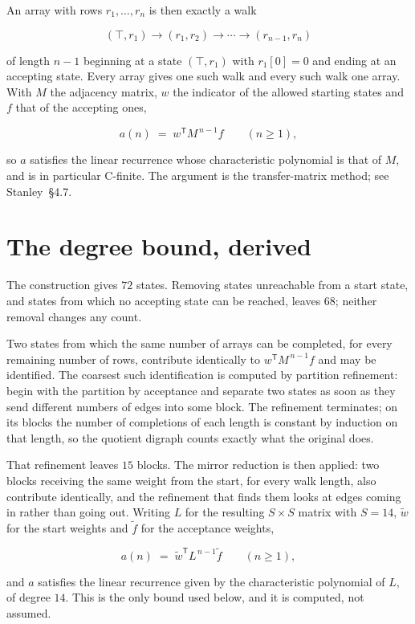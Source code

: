 \documentclass[11pt]{article}
\theoremstyle{definition}
\begin{document}
An array with rows $r_1,\dots,r_n$ is then exactly a walk

\[(\top,r_1) \to (r_1,r_2) \to \cdots \to (r_{n-1},r_n)\]

of length $n-1$ beginning at a state $(\top,r_1)$ with $r_1[0]=0$ and ending at an accepting state. Every array gives one such walk and every such walk one array. With $M$ the adjacency matrix, $w$ the indicator of the allowed starting states and $f$ that of the accepting ones,

\[a(n) \;=\; w^{\mathsf T} M^{\,n-1} f \qquad (n \ge 1),\]

so $a$ satisfies the linear recurrence whose characteristic polynomial is that of $M$, and is in particular C-finite. The argument is the transfer-matrix method; see Stanley~\S4.7.

\section{The degree bound, derived}

The construction gives $72$ states. Removing states unreachable from a start state, and states from which no accepting state can be reached, leaves $68$; neither removal changes any count.

Two states from which the same number of arrays can be completed, for every remaining number of rows, contribute identically to $w^{\mathsf T}M^{\,n-1}f$ and may be identified. The coarsest such identification is computed by partition refinement: begin with the partition by acceptance and separate two states as soon as they send different numbers of edges into some block. The refinement terminates; on its blocks the number of completions of each length is constant by induction on that length, so the quotient digraph counts exactly what the original does.

That refinement leaves $15$ blocks. The mirror reduction is then applied: two blocks receiving the same weight from the start, for every walk length, also contribute identically, and the refinement that finds them looks at edges coming in rather than going out. Writing $L$ for the resulting $S \times S$ matrix with $S = 14$, $\tilde w$ for the start weights and $\tilde f$ for the acceptance weights,

\[a(n) \;=\; \tilde w^{\mathsf T} L^{\,n-1} \tilde f \qquad (n \ge 1),\]

and $a$ satisfies the linear recurrence given by the characteristic polynomial of $L$, of degree $14$. This is the only bound used below, and it is computed, not assumed.
\end{document}
